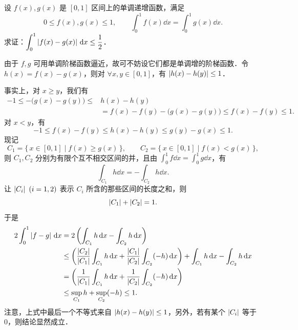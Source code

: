 设 $f(x),g(x)$ 是 $[0,1]$ 区间上的单调递增函数，满足
\[
  0\le f(x),g(x)\le 1,\qquad \int_0^1 f(x)\dd x=\int_0^1 g(x)\dd x.
\]
求证：$\displaystyle\int_0^1\left|f(x)-g(x)\right|\,\mathrm{d} x\le\frac{1}{2}$．
\begin{solution}
由于 $f,g$ 可用单调阶梯函数逼近，故可不妨设它们都是单调增的阶梯函数．令 $h(x)=f(x)-g(x)$，则对 $\forall x,y\in[0,1]$，有 $\left|h(x)-h(y)\right|\le 1$．

事实上，对 $x\ge y$，我们有
\begin{align*}
  -1\le -\bigl(g(x)-g(y)\bigr)\le{}&h(x)-h(y)\\
  &{}=f(x)-f(y)-\bigl(g(x)-g(y)\bigr)\le f(x)-f(y)\le 1.
\end{align*}
对 $x<y$，有
\[
  -1\le f(x)-f(y)\le h(x)-h(y)\le g(y)-g(x)\le 1.
\]
现记
\[
  C_1=\{\,x\in[0,1]\mid f(x)\ge g(x)\,\},\qquad
  C_2=\{\,x\in[0,1]\mid f(x)<g(x)\,\},
\]
则 $C_1,C_2$ 分别为有限个互不相交区间的并，且由 $\displaystyle\int_0^1 f\dd x=\int_0^1 g\dd x$，有
\[
  \int_{C_1}h\dd x=-\int_{C_2}h\dd x.
\]
让 $\left|C_i\right|\ (i=1,2)$ 表示 $C_i$ 所含的那些区间的长度之和，则
\[
  \left|C_1\right|+\left|C_2\right|=1.
\]
于是
\begin{align*}
  2\int_0^1\left|f-g\right|\,\mathrm{d} x
  &=2\left(\int_{C_1}h\,\mathrm{d} x-\int_{C_2}h\,\mathrm{d} x\right)\\
  &\le\left(\frac{\left|C_2\right|}{\left|C_1\right|}\int_{C_1}h\,\mathrm{d} x
    +\frac{\left|C_1\right|}{\left|C_2\right|}\int_{C_2}(-h)\,\mathrm{d} x\right)
    +\int_{C_1}h\,\mathrm{d} x-\int_{C_2}h\,\mathrm{d} x\\
  &=\left(\frac{1}{\left|C_1\right|}\int_{C_1}h\,\mathrm{d} x
    +\frac{1}{\left|C_2\right|}\int_{C_2}(-h)\,\mathrm{d} x\right)\\
  &\le\sup_{C_1}h+\sup_{C_2}(-h)\le 1.
\end{align*}
注意，上式中最后一个不等式来自 $\left|h(x)-h(y)\right|\le 1$，另外，若有某个 $\left|C_i\right|$ 等于 $0$，则结论显然成立．
\end{solution}
